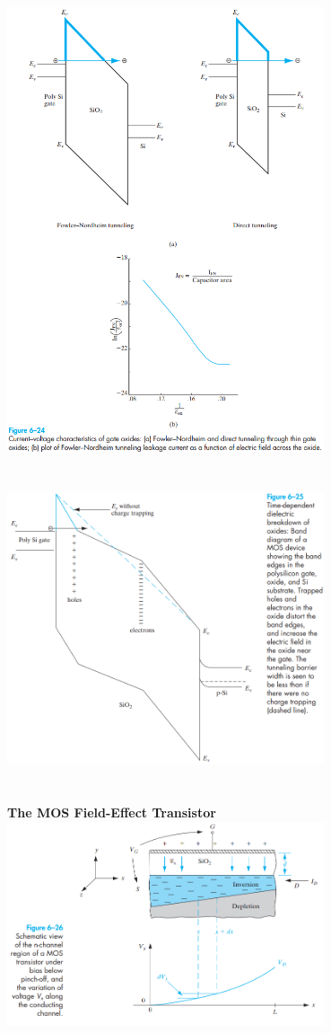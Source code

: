 \documentclass[8pt]{article}
\newcommand{\sect}[1]{\noindent\textbf{#1}\\}
\newcommand{\hl}{\noindent\makebox[\linewidth]{\rule{\textwidth}{0.2pt}}}
\begin{document}
\begin{center}
		\includegraphics[width=0.7\textwidth]{fig6-24} \\ \hl \\~\\
		\includegraphics[width=0.7\textwidth]{fig6-25} \\ \hl \\~\\
		\sect{\Large{The MOS Field-Effect Transistor}}
		\includegraphics[width=0.7\textwidth]{fig6-26} \\ \hl \\~\\

\end{center}
\end{document}
